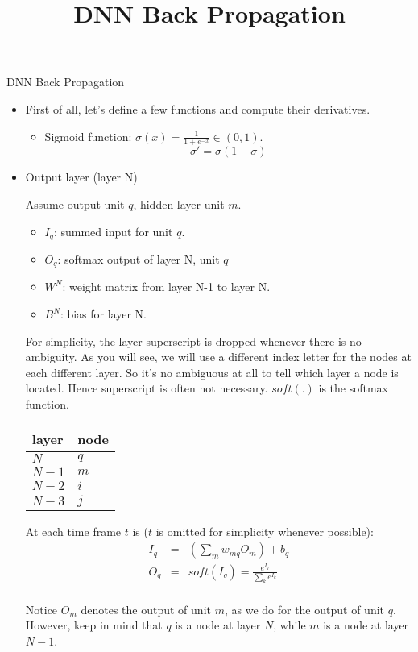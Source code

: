 \documentclass[9pt]{article}
\title{DNN Back Propagation}
\begin{document}
\large{DNN Back Propagation}

\begin{itemize}
\item First of all, let's define a few functions and compute their derivatives.
\begin{itemize}
\item Sigmoid function: $\sigma(x)=\frac{1}{1+e^{-x}} \in (0,1)$.
\[\sigma' = \sigma (1 - \sigma) \]


\end{itemize}
\item Output layer (layer N)

Assume output unit $q$, hidden layer unit $m$.
\begin{itemize}
\item $I_q$: summed input for unit $q$. 
\item $O_q$: softmax output of layer N, unit $q$
\item $W^N$: weight matrix from layer N-1 to layer N.
\item $B^N$: bias for layer N.
\end{itemize}
For simplicity, the layer superscript is dropped whenever there is no ambiguity.
As you will see, we will use a different index letter for the nodes at
each different layer. So it's no ambiguous at all to tell which layer a node
is located. Hence superscript is often not necessary. $soft(.)$ is the softmax function.

\begin{center}
\begin{tabular}{|l|l|} \hline
layer & node \\ \hline \hline
$N$ & $q$ \\ \hline
$N-1$ & $m$ \\ \hline
$N-2$ & $i$ \\ \hline
$N-3$ & $j$ \\ \hline
\end{tabular}
\end{center}

At each time frame $t$ is ($t$ is omitted for simplicity whenever possible):
\begin{eqnarray*}
I_q&  = &(\sum_m w_{mq} O_m) + b_q \\
O_q & = & soft(I_q) = \frac{e^{I_q}}{\sum_k e^{I_k}} \\
\end{eqnarray*}

Notice $O_m$ denotes the output of unit $m$, as we do for the output
of unit $q$. However, keep in mind that $q$ is a node at layer $N$, while
$m$ is a node at layer $N-1$. 


\end{itemize}
\end{document}

